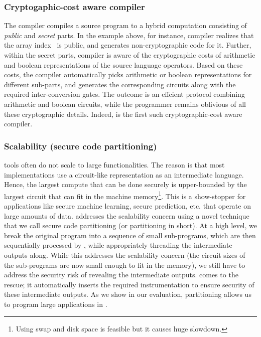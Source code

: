 \subsubsection*{Cryptogaphic-cost aware compiler} The \tool compiler
compiles a source program to a hybrid computation consisting
of \emph{public} and \emph{secret} parts. In the example above, for
instance, \tool compiler realizes that the array index~ is
public, and generates non-cryptographic code for it.
Further, within the secret parts, \tool compiler is
aware
of the cryptographic costs of arithmetic and boolean representations
of the source language operators. Based on these costs, the compiler
automatically picks arithmetic or boolean
representations for different sub-parts, and generates the
corresponding circuits along with the required inter-conversion
gates. The outcome is an effcient \mpc protocol combining arithmetic
and boolean circuits, while the programmer remains
oblivious of all these cryptographic details. Indeed, \tool is the
first such cryptographic-cost aware compiler.

\subsubsection*{Scalability (secure code partitioning)} \mpc tools
often do not scale to large functionalities. The reason is that
most \mpc implementations use a circuit-like representation as an
intermediate language. Hence, the largest compute that can be done
securely is upper-bounded by the largest circuit that can fit in the
machine memory\footnote{Using swap and
disk space is feasible but it causes huge slowdown.}. This is a
show-stopper for applications like secure machine learning, secure
prediction, etc. that operate on large amounts of data.
\tool addresses the scalability concern using a novel technique that
we call secure code partitioning (or partitioning in short). At
a high level, we break the original program into a sequence of small
sub-programs, which are then sequentially processed by \tool, while
appropriately threading the intermediate outputs
along. While this
addresses the scalability concern (the circuit
sizes of the sub-programs are now small enough to fit in the memory),
we still have to address
the security risk of revealing the intermediate outputs. \tool comes
to the rescue; it automatically inserts the required instrumentation
to ensure security of these intermediate outputs. As
we show in our
evaluation, partitioning allows us to program large applications
in \tool.

